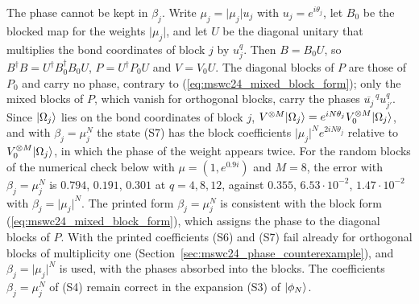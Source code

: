 \documentclass{article}
\begin{document}
The phase cannot be kept in $\beta_j$. Write $\mu_j=\lvert\mu_j\rvert u_j$ with
$u_j=e^{i\theta_j}$, let $B_0$ be the blocked map for the weights $\lvert\mu_j\rvert$, and let
$U$ be the diagonal unitary that multiplies the bond coordinates of block $j$ by $u_j^q$. Then
$B=B_0U$, so $B^\dagger B=U^\dagger B_0^\dagger B_0U$, $P=U^\dagger P_0U$ and $V=V_0U$. The
diagonal blocks of $P$ are those of $P_0$ and carry no phase, contrary to
(\ref{eq:mswc24_mixed_block_form}); only the mixed blocks of $P$, which vanish for orthogonal
blocks, carry the phases $\overline{u_j}^{\,q}u_{j'}^q$. Since $|\Omega_j\rangle$ lies on the bond
coordinates of block $j$, $V^{\otimes M}|\Omega_j\rangle=e^{iN\theta_j}V_0^{\otimes M}|\Omega_j\rangle$,
and with $\beta_j=\mu_j^N$ the state (S7) has the block coefficients
$\lvert\mu_j\rvert^Ne^{2iN\theta_j}$ relative to $V_0^{\otimes M}|\Omega_j\rangle$, in which the
phase of the weight appears twice. For the random blocks of the numerical check below with $\mu=(1,e^{0.9i})$ and
$M=8$, the error with $\beta_j=\mu_j^N$ is $0.794$, $0.191$, $0.301$ at $q=4,8,12$, against
$0.355$, $6.53\cdot10^{-2}$, $1.47\cdot10^{-2}$ with $\beta_j=\lvert\mu_j\rvert^N$. The printed
form $\beta_j=\mu_j^N$ is consistent with the block form (\ref{eq:mswc24_mixed_block_form}),
which assigns the phase to the diagonal blocks of $P$. With the printed coefficients (S6) and
(S7) fail already for orthogonal blocks of multiplicity one
(Section~\ref{sec:mswc24_phase_counterexample}), and
$\beta_j=\lvert\mu_j\rvert^N$ is used, with the phases absorbed into the blocks. The
coefficients $\beta_j=\mu_j^N$ of (S4) remain correct in the expansion (S3) of
$|\phi_N\rangle$.
\end{document}

